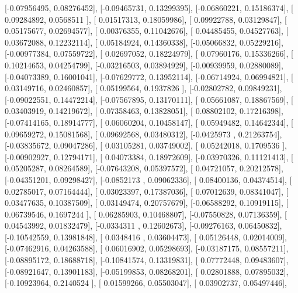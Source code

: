 \documentclass{article}
\begin{document}
       [-0.07956495,  0.08276452],
       [-0.09465731,  0.13299395],
       [-0.06860221,  0.15186374],
       [ 0.09284892,  0.0568511 ],
       [ 0.01517313,  0.18059986],
       [ 0.09922788,  0.03129847],
       [ 0.05175677,  0.02694577],
       [ 0.00376355,  0.11042676],
       [ 0.04485455,  0.04527763],
       [ 0.03672088,  0.12232114],
       [ 0.05184924,  0.14360338],
       [-0.05066832,  0.05229216],
       [-0.00977384,  0.07559722],
       [ 0.02697052,  0.18224979],
       [ 0.07960176,  0.15336266],
       [ 0.10214653,  0.04254799],
       [-0.03216503,  0.03894929],
       [-0.00939959,  0.02880089],
       [-0.04073389,  0.16001041],
       [-0.07629772,  0.13952114],
       [-0.06714924,  0.06994821],
       [ 0.03149716,  0.02460857],
       [ 0.05199564,  0.1937826 ],
       [-0.02802782,  0.09849231],
       [-0.09022551,  0.14472214],
       [-0.07567895,  0.13170111],
       [ 0.05661087,  0.18867569],
       [ 0.03403919,  0.14219672],
       [ 0.07358463,  0.13828051],
       [ 0.08802102,  0.17216398],
       [-0.07414165,  0.18914777],
       [ 0.06060204,  0.10458147],
       [ 0.05949482,  0.14642344],
       [ 0.09659272,  0.15081568],
       [ 0.09692568,  0.03480312],
       [-0.0425973 ,  0.21263754],
       [-0.03835672,  0.09047286],
       [ 0.03105281,  0.03749002],
       [ 0.05242018,  0.1709536 ],
       [-0.00902927,  0.12794171],
       [ 0.04073384,  0.18972609],
       [-0.03970326,  0.11121413],
       [ 0.05205287,  0.08264589],
       [-0.07643208,  0.05397572],
       [ 0.04721057,  0.20212578],
       [-0.04351201,  0.09298427],
       [-0.0852173 ,  0.09062336],
       [ 0.08400136,  0.04374514],
       [ 0.02785017,  0.07164444],
       [ 0.03023397,  0.17387036],
       [ 0.07012639,  0.08341047],
       [ 0.03477635,  0.10387509],
       [ 0.03149474,  0.20757679],
       [-0.06588292,  0.10919115],
       [ 0.06739546,  0.1697244 ],
       [ 0.06285903,  0.10468807],
       [-0.07550828,  0.07136359],
       [ 0.04543992,  0.01832479],
       [-0.0334311 ,  0.12602673],
       [-0.09276163,  0.06450832],
       [-0.10542559,  0.13981848],
       [ 0.0348416 ,  0.03604473],
       [ 0.05126448,  0.02014009],
       [-0.07462916,  0.04263588],
       [ 0.06016902,  0.05298693],
       [-0.03187175,  0.08557211],
       [-0.08895172,  0.18688718],
       [-0.10841574,  0.13319831],
       [ 0.07772448,  0.09483607],
       [-0.08921647,  0.13901183],
       [-0.05199853,  0.08268201],
       [ 0.02801888,  0.07895032],
       [-0.10923964,  0.2140524 ],
       [ 0.01599266,  0.05503047],
       [ 0.03902737,  0.05497446],
\end{document}
